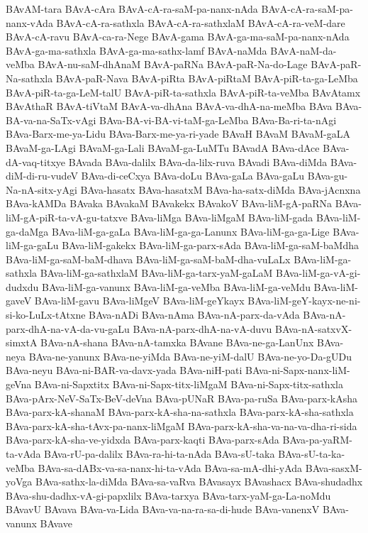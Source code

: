 {BAvAM-tara
BAvA-cAra
BAvA-cA-ra-saM-pa-nanx-nAda
BAvA-cA-ra-saM-pa-nanx-vAda
BAvA-cA-ra-sathxla
BAvA-cA-ra-sathxlaM
BAvA-cA-ra-veM-dare
BAvA-cA-ravu
BAvA-ca-ra-Nege
BAvA-gama
BAvA-ga-ma-saM-pa-nanx-nAda
BAvA-ga-ma-sathxla
BAvA-ga-ma-sathx-lamf
BAvA-naMda
BAvA-naM-da-veMba
BAvA-nu-saM-dhAnaM
BAvA-paRNa
BAvA-paR-Na-do-Lage
BAvA-paR-Na-sathxla
BAvA-paR-Nava
BAvA-piRta
BAvA-piRtaM
BAvA-piR-ta-ga-LeMba
BAvA-piR-ta-ga-LeM-talU
BAvA-piR-ta-sathxla
BAvA-piR-ta-veMba
BAvAtamx
BAvAthaR
BAvA-tiVtaM
BAvA-va-dhAna
BAvA-va-dhA-na-meMba
BAva
BAva-BA-va-na-SaTx-vAgi
BAva-BA-vi-BA-vi-taM-ga-LeMba
BAva-Ba-ri-ta-nAgi
BAva-Barx-me-ya-Lidu
BAva-Barx-me-ya-ri-yade
BAvaH
BAvaM
BAvaM-gaLA
BAvaM-ga-LAgi
BAvaM-ga-Lali
BAvaM-ga-LuMTu
BAvadA
BAva-dAce
BAva-dA-vaq-titxye
BAvada
BAva-dalilx
BAva-da-lilx-ruva
BAvadi
BAva-diMda
BAva-diM-di-ru-vudeV
BAva-di-ceCxya
BAva-doLu
BAva-gaLa
BAva-gaLu
BAva-gu-Na-nA-sitx-yAgi
BAva-hasatx
BAva-hasatxM
BAva-ha-satx-diMda
BAva-jAcnxna
BAva-kAMDa
BAvaka
BAvakaM
BAvakekx
BAvakoV
BAva-liM-gA-paRNa
BAva-liM-gA-piR-ta-vA-gu-tatxve
BAva-liMga
BAva-liMgaM
BAva-liM-gada
BAva-liM-ga-daMga
BAva-liM-ga-gaLa
BAva-liM-ga-ga-Lanunx
BAva-liM-ga-ga-Lige
BAva-liM-ga-gaLu
BAva-liM-gakekx
BAva-liM-ga-parx-sAda
BAva-liM-ga-saM-baMdha
BAva-liM-ga-saM-baM-dhava
BAva-liM-ga-saM-baM-dha-vuLaLx
BAva-liM-ga-sathxla
BAva-liM-ga-sathxlaM
BAva-liM-ga-tarx-yaM-gaLaM
BAva-liM-ga-vA-gi-dudxdu
BAva-liM-ga-vanunx
BAva-liM-ga-veMba
BAva-liM-ga-veMdu
BAva-liM-gaveV
BAva-liM-gavu
BAva-liMgeV
BAva-liM-geYkayx
BAva-liM-geY-kayx-ne-ni-si-ko-LuLx-tAtxne
BAva-nADi
BAva-nAma
BAva-nA-parx-da-vAda
BAva-nA-parx-dhA-na-vA-da-vu-gaLu
BAva-nA-parx-dhA-na-vA-duvu
BAva-nA-satxvX-simxtA
BAva-nA-shana
BAva-nA-tamxka
BAvane
BAva-ne-ga-LanUnx
BAva-neya
BAva-ne-yanunx
BAva-ne-yiMda
BAva-ne-yiM-dalU
BAva-ne-yo-Da-gUDu
BAva-neyu
BAva-ni-BAR-va-davx-yada
BAva-niH-pati
BAva-ni-Sapx-nanx-liM-geVna
BAva-ni-Sapxtitx
BAva-ni-Sapx-titx-liMgaM
BAva-ni-Sapx-titx-sathxla
BAva-pArx-NeV-SaTx-BeV-deVna
BAva-pUNaR
BAva-pa-ruSa
BAva-parx-kAsha
BAva-parx-kA-shanaM
BAva-parx-kA-sha-na-sathxla
BAva-parx-kA-sha-sathxla
BAva-parx-kA-sha-tAvx-pa-nanx-liMgaM
BAva-parx-kA-sha-va-na-va-dha-ri-sida
BAva-parx-kA-sha-ve-yidxda
BAva-parx-kaqti
BAva-parx-sAda
BAva-pa-yaRM-ta-vAda
BAva-rU-pa-dalilx
BAva-ra-hi-ta-nAda
BAva-sU-taka
BAva-sU-ta-ka-veMba
BAva-sa-dABx-va-sa-nanx-hi-ta-vAda
BAva-sa-mA-dhi-yAda
BAva-sasxM-yoVga
BAva-sathx-la-diMda
BAva-sa-vaRva
BAvasayx
BAvashacx
BAva-shudadhx
BAva-shu-dadhx-vA-gi-papxlilx
BAva-tarxya
BAva-tarx-yaM-ga-La-noMdu
BAvavU
BAvava
BAva-va-Lida
BAva-va-na-ra-sa-di-hude
BAva-vanenxV
BAva-vanunx
BAvave
}
